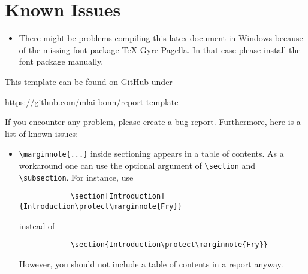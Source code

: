 \documentclass[logo]{mlai-report}
\begin{document}
	\printbibliography
	
	\appendix
	
	\section{Known Issues} 
	\begin{itemize}
		\item There might be problems compiling this latex document in Windows because of the missing font package TeX Gyre Pagella. In that case please install the font package manually.
	\end{itemize}
	
	
	This template can be found on GitHub under 
	\begin{center}
		\url{https://github.com/mlai-bonn/report-template}
	\end{center}
	If you encounter any problem, please create a bug report. Furthermore, here is a list of known issues: 
	\begin{itemize} 
		\item \verb|\marginnote{...}| inside sectioning appears in a table of contents. As a work\-around one can use the optional argument of \verb|\section| and \verb|\subsection|. For instance, use 
		\begin{verbatim}
			\section[Introduction]{Introduction\protect\marginnote{Fry}}
		\end{verbatim}
		instead of 
		\begin{verbatim}
			\section{Introduction\protect\marginnote{Fry}}
		\end{verbatim}
		However, you should not include a table of contents in a report anyway. 
	\end{itemize}
\end{document}
